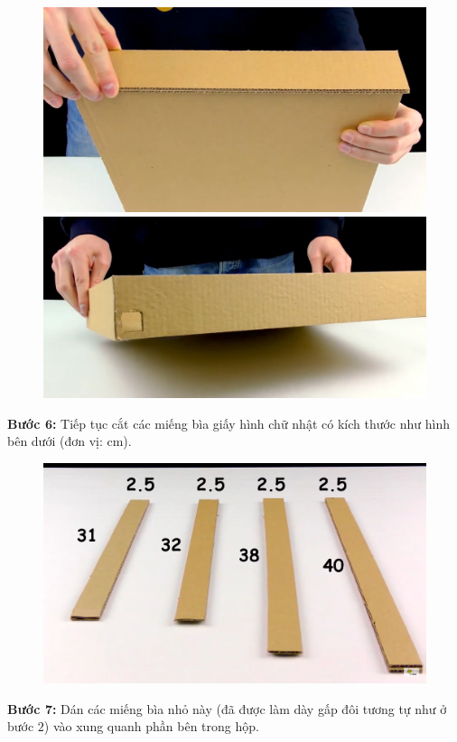 \begin{multicols}{2}
\begin{figure}[H]
		\vspace*{1pt}
		\includegraphics[width= 0.8\linewidth]{8}
		
		\vspace*{1pt}
		\includegraphics[width= 0.8\linewidth]{9}
		\vspace*{-10pt}
	\end{figure}
	\textbf{\color{toancuabi}Bước $\pmb{6}$:} Tiếp tục cắt các miếng bìa giấy hình chữ nhật có kích thước như hình bên dưới (đơn vị: cm).
	\begin{figure}[H]
		\vspace*{-5pt}
		\centering
		\captionsetup{labelformat= empty, justification=centering}
		\includegraphics[width= 0.8\linewidth]{10}
		\vspace*{-10pt}
	\end{figure}
	\textbf{\color{toancuabi}Bước $\pmb{7}$:} Dán các miếng bìa nhỏ này (đã được làm dày gấp đôi tương tự như ở bước $2$) vào xung quanh phần bên trong hộp.

\end{multicols}

